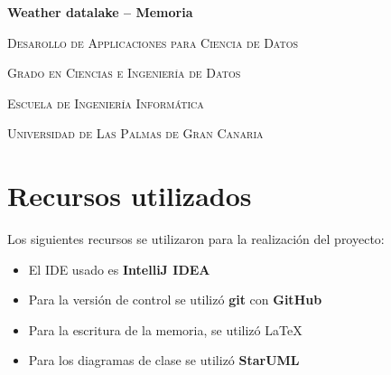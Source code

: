\documentclass{article}
\begin{document}
\begin{titlepage}
	\centering
	{\huge\bfseries Weather datalake -- Memoria\par}
	\vspace{3cm}
	{\scshape\large Desarollo de Applicaciones para Ciencia de Datos\par}
	\vspace{1cm}
	{\scshape\large Grado en Ciencias e Ingeniería de Datos\par}
	\vspace{1cm}
	{\scshape\large Escuela de Ingeniería Informática\par}
	\vspace{1cm}
	{\scshape\large Universidad de Las Palmas de Gran Canaria\par}
\end{titlepage}

\newpage

\begin{abstract}

El proyecto de Weather Datalake consiste de tres programas escritos en Java:

\begin{itemize}
	\item \textbf{Weather feeder}: Se descarga datos meteorológicos de una API y los guarda en un datalake.
	\item \textbf{Weather datamart}: Lee los datos del datalake y crea o actualiza un datamart para obtener el tiempo y lugar de extremos en la temperatura.
	\item \textbf{Weather service}: Un servidor HTTP que provee un API REST para obtener el tiempo y lugar de extremos de temperatura.
\end{itemize}

\end{abstract}

\newpage

\tableofcontents

\newpage

\section{Recursos utilizados}

Los siguientes recursos se utilizaron para la realización del proyecto:

\begin{itemize}
	\item El IDE usado es \textbf{IntelliJ IDEA}
	\item Para la versión de control se utilizó \textbf{git} con \textbf{GitHub}
	\item Para la escritura de la memoria, se utilizó \LaTeX{}
	\item Para los diagramas de clase se utilizó \textbf{StarUML}
\end{itemize}
\end{document}
